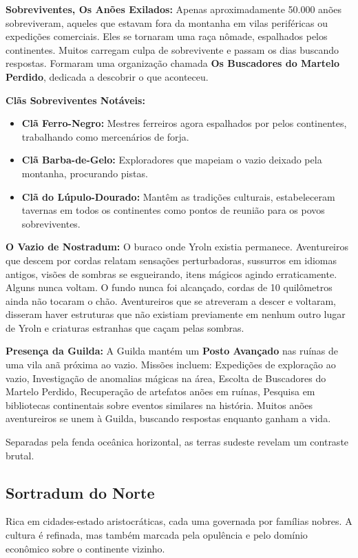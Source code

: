 \textbf{\ringmfamily Sobreviventes, Os Anões Exilados:}
Apenas aproximadamente 50.000 anões sobreviveram, aqueles que estavam fora da montanha em vilas periféricas ou expedições comerciais. Eles se tornaram uma raça nômade, espalhados pelos continentes. Muitos carregam culpa de sobrevivente e passam os dias buscando respostas. Formaram uma organização chamada \textbf{Os Buscadores do Martelo Perdido}, dedicada a descobrir o que aconteceu.

\textbf{\ringmfamily Clãs Sobreviventes Notáveis:}
\begin{itemize}
    \item \textbf{\ringmfamily Clã Ferro-Negro:} Mestres ferreiros agora espalhados por pelos continentes, trabalhando como mercenários de forja.
    \item \textbf{\ringmfamily Clã Barba-de-Gelo:} Exploradores que mapeiam o vazio deixado pela montanha, procurando pistas.
    \item \textbf{\ringmfamily Clã do Lúpulo-Dourado:} Mantêm as tradições culturais, estabeleceram tavernas em todos os continentes como pontos de reunião para os povos sobreviventes.
\end{itemize}

\textbf{\ringmfamily O Vazio de Nostradum:}
O buraco onde Yroln existia permanece. Aventureiros que descem por cordas relatam sensações perturbadoras, sussurros em idiomas antigos, visões de sombras se esgueirando, itens mágicos agindo erraticamente. Alguns nunca voltam. O fundo nunca foi alcançado, cordas de 10 quilômetros ainda não tocaram o chão. Aventureiros que se atreveram a descer e voltaram, disseram haver estruturas que não existiam previamente em nenhum outro lugar de Yroln e criaturas estranhas que caçam pelas sombras.

\textbf{\ringmfamily Presença da Guilda:}
A Guilda mantém um \textbf{Posto Avançado} nas ruínas de uma vila anã próxima ao vazio. Missões incluem: Expedições de exploração ao vazio, Investigação de anomalias mágicas na área, Escolta de Buscadores do Martelo Perdido, Recuperação de artefatos anões em ruínas, Pesquisa em bibliotecas continentais sobre eventos similares na história.
Muitos anões aventureiros se unem à Guilda, buscando respostas enquanto ganham a vida.

Separadas pela fenda oceânica horizontal, as terras sudeste revelam um contraste brutal.

\subsection*{Sortradum do Norte}
Rica em cidades-estado aristocráticas, cada uma governada por famílias nobres. A cultura é refinada, mas também marcada pela opulência e pelo domínio econômico sobre o continente vizinho.

